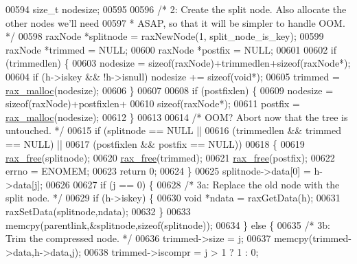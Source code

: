 \begin{DoxyCode}
{{{{{{{{{{00594         size\_t nodesize;
00595 
00596         \textcolor{comment}{/* 2: Create the split node. Also allocate the other nodes we'll need}
00597 \textcolor{comment}{         *    ASAP, so that it will be simpler to handle OOM. */}
00598         raxNode *splitnode = raxNewNode(1, split\_node\_is\_key);
00599         raxNode *trimmed = NULL;
00600         raxNode *postfix = NULL;
00601 
00602         \textcolor{keywordflow}{if} (trimmedlen) \{
00603             nodesize = \textcolor{keyword}{sizeof}(raxNode)+trimmedlen+\textcolor{keyword}{sizeof}(raxNode*);
00604             \textcolor{keywordflow}{if} (h->iskey && !h->isnull) nodesize += \textcolor{keyword}{sizeof}(\textcolor{keywordtype}{void}*);
00605             trimmed = \hyperlink{rax__malloc_8h_aba4b5d6a50f54903fe9c330308beb66a}{rax\_malloc}(nodesize);
00606         \}
00607 
00608         \textcolor{keywordflow}{if} (postfixlen) \{
00609             nodesize = \textcolor{keyword}{sizeof}(raxNode)+postfixlen+
00610                        \textcolor{keyword}{sizeof}(raxNode*);
00611             postfix = \hyperlink{rax__malloc_8h_aba4b5d6a50f54903fe9c330308beb66a}{rax\_malloc}(nodesize);
00612         \}
00613 
00614         \textcolor{comment}{/* OOM? Abort now that the tree is untouched. */}
00615         \textcolor{keywordflow}{if} (splitnode == NULL ||
00616             (trimmedlen && trimmed == NULL) ||
00617             (postfixlen && postfix == NULL))
00618         \{
00619             \hyperlink{rax__malloc_8h_a3adfa16bca6cd23b6e125fd441465e49}{rax\_free}(splitnode);
00620             \hyperlink{rax__malloc_8h_a3adfa16bca6cd23b6e125fd441465e49}{rax\_free}(trimmed);
00621             \hyperlink{rax__malloc_8h_a3adfa16bca6cd23b6e125fd441465e49}{rax\_free}(postfix);
00622             errno = ENOMEM;
00623             \textcolor{keywordflow}{return} 0;
00624         \}
00625         splitnode->data[0] = h->data[j];
00626 
00627         \textcolor{keywordflow}{if} (j == 0) \{
00628             \textcolor{comment}{/* 3a: Replace the old node with the split node. */}
00629             \textcolor{keywordflow}{if} (h->iskey) \{
00630                 \textcolor{keywordtype}{void} *ndata = raxGetData(h);
00631                 raxSetData(splitnode,ndata);
00632             \}
00633             memcpy(parentlink,&splitnode,\textcolor{keyword}{sizeof}(splitnode));
00634         \} \textcolor{keywordflow}{else} \{
00635             \textcolor{comment}{/* 3b: Trim the compressed node. */}
00636             trimmed->size = j;
00637             memcpy(trimmed->data,h->data,j);
00638             trimmed->iscompr = j > 1 ? 1 : 0;
}}}}}}}}}}
\end{DoxyCode}
